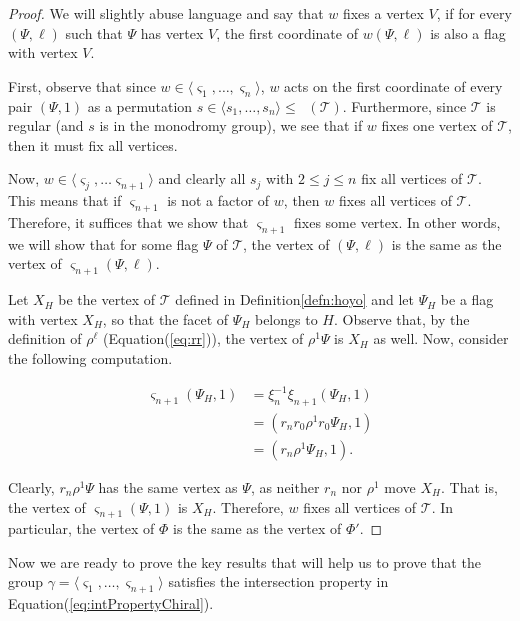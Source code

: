 \documentclass[final]{amsart}
\theoremstyle{plain}
\theoremstyle{definition}
\theoremstyle{remark}
\numberwithin{equation}{section}
\renewcommand{\leq}{\leqslant} \renewcommand{\geq}{\geqslant}
\renewcommand{\{}{\lbrace}
\renewcommand{\}}{\rbrace}
\newcommand{\cT}{\mathcal{T}}
\DeclareMathOperator{\mon}{Mon}
\DeclareMathOperator{\monp}{\mon^{+}}
\newcommand{\te}{\xi}
\newcommand{\es}{\varsigma}
\begin{document}
\begin{proof}
We will slightly abuse language and say that $w$ fixes a vertex $V$, if for every $(\Psi,\ell)$ such that $\Psi$ has vertex $V$, the first coordinate of $w(\Psi,\ell)$ is also a flag with vertex $V$.

First, observe that since $w \in \langle \es_{1}, \dots, \es_{n} \rangle$, $w$ acts on the first coordinate of every pair $(\Psi,1)$ as a permutation $s \in \langle s_{1}, \dots, s_{n} \rangle \leq \monp(\cT)$. Furthermore, since $\cT$ is regular (and $s$ is in the monodromy group), we see that if $w$ fixes one vertex of $\cT$, then it must fix all vertices. 

Now, $w \in \langle \es_{j}, \dots \es_{n+1} \rangle$ and clearly all $s_{j}$ with $2 \leq j \leq n$ fix all vertices of $\cT$. This means that if $\es_{n+1}$ is not a factor of $w$, then $w$ fixes all vertices of $\cT$. Therefore, it suffices that we show that $\es_{n+1}$ fixes some vertex. In other words, we will show that for some flag $\Psi$ of $\cT$, the vertex of $(\Psi,\ell)$ is the same as the vertex of $\es_{n+1}(\Psi,\ell)$.



Let $X_H$ be the vertex of $\cT$ defined in  Definition\nobreakspace \ref {defn:hoyo} and let $\Psi_H$ be a flag with vertex $X_H$, so that the facet of $\Psi_H$ belongs to $H$. Observe that, by the definition of $\rho^\ell$ (Equation\nobreakspace \textup {(\ref {eq:rr})}), the vertex of $\rho^1 \Psi$ is $X_H$ as well. Now, consider the following computation.

\begin{align*}
    \es_{n+1} (\Psi_H,1) 
    &= \te_{n}^{-1}\te_{n+1}(\Psi_H,1) \\
    &= (r_nr_0\rho^{1}r_0 \Psi_H,1)\\
    &= (r_n\rho^{1}\Psi_H,1).
\end{align*}

Clearly, $r_n\rho^1\Psi$ has the same vertex as $\Psi$, as neither $r_n$ nor $\rho^1$ move $X_H$. That is, the vertex of $\es_{n+1} (\Psi,1)$ is $X_H$. Therefore, $w$ fixes all vertices of $\cT$. In particular, the vertex of $\Phi$ is the same as the vertex of $\Phi'$.
\end{proof}

Now we are ready to prove the key results that will help us to prove that the group $\gamma =\langle \es_{1}, \dots, \es_{n+1} \rangle$ satisfies the intersection property in Equation\nobreakspace \textup {(\ref {eq:intPropertyChiral})}.
\end{document}
